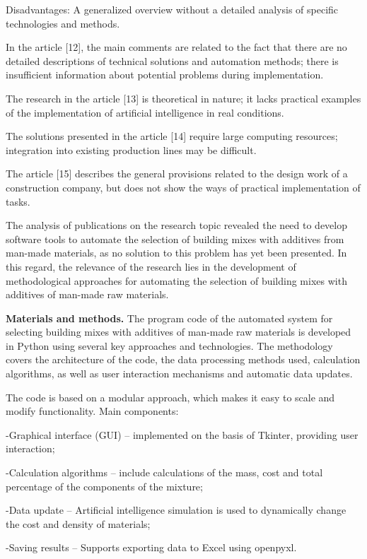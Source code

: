 \documentclass[
]{article}
\begin{document}
Disadvantages: A generalized overview without a detailed analysis of
specific technologies and methods.

In the article {[}12{]}, the main comments are related to the fact that
there are no detailed descriptions of technical solutions and automation
methods; there is insufficient information about potential problems
during implementation.

The research in the article {[}13{]} is theoretical in nature; it lacks
practical examples of the implementation of artificial intelligence in
real conditions.

The solutions presented in the article {[}14{]} require large computing
resources; integration into existing production lines may be difficult.

The article {[}15{]} describes the general provisions related to the
design work of a construction company, but does not show the ways of
practical implementation of tasks.

The analysis of publications on the research topic revealed the need to
develop software tools to automate the selection of building mixes with
additives from man-made materials, as no solution to this problem has
yet been presented. In this regard, the relevance of the research lies
in the development of methodological approaches for automating the
selection of building mixes with additives of man-made raw materials.

\textbf{Materials and methods.} The program code of the automated system
for selecting building mixes with additives of man-made raw materials is
developed in Python using several key approaches and technologies. The
methodology covers the architecture of the code, the data processing
methods used, calculation algorithms, as well as user interaction
mechanisms and automatic data updates.

The code is based on a modular approach, which makes it easy to scale
and modify functionality. Main components:

-Graphical interface (GUI) -- implemented on the basis of Tkinter,
providing user interaction;

-Calculation algorithms -- include calculations of the mass, cost and
total percentage of the components of the mixture;

-Data update -- Artificial intelligence simulation is used to
dynamically change the cost and density of materials;

-Saving results -- Supports exporting data to Excel using openpyxl.
\end{document}
